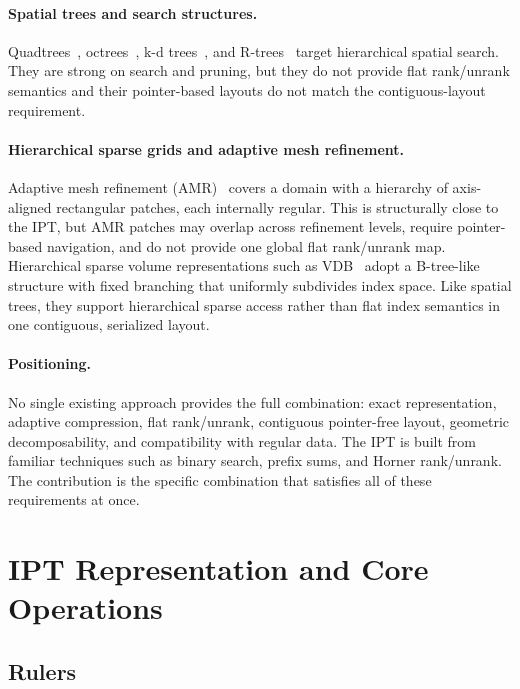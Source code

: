 \documentclass[manuscript,screen,review]{acmart}
\theoremstyle{definition}
\theoremstyle{plain}
\begin{document}
\paragraph{Spatial trees and search structures.}
Quadtrees~\cite{FinkelBentley1974}, octrees~\cite{Meagher1982},
k-d trees~\cite{Bentley1975}, and R-trees~\cite{Guttman1984} target
hierarchical spatial search. They are strong on search and pruning, but
they do not provide flat rank/unrank semantics and their pointer-based
layouts do not match the contiguous-layout requirement.

\paragraph{Hierarchical sparse grids and adaptive mesh refinement.}
Adaptive mesh refinement (AMR)~\cite{BergerOliger1984,BergerColella1989}
covers a domain with a hierarchy of axis-aligned rectangular patches,
each internally regular. This is structurally close to the IPT, but AMR
patches may overlap across refinement levels, require pointer-based
navigation, and do not provide one global flat rank/unrank map.
Hierarchical sparse volume representations such as VDB~\cite{Museth2013}
adopt a B-tree-like structure with fixed branching that uniformly
subdivides index space. Like spatial trees, they support hierarchical
sparse access rather than flat index semantics in one contiguous,
serialized layout.

\paragraph{Positioning.}
No single existing approach provides the full combination: exact
representation, adaptive compression, flat rank/unrank, contiguous
pointer-free layout, geometric decomposability, and compatibility with
regular data. The IPT is built from familiar techniques such as binary
search, prefix sums, and Horner rank/unrank. The contribution is the
specific combination that satisfies all of these requirements at once.

\section{IPT Representation and Core Operations}
\label{section:representation}

\subsection{Rulers}
\end{document}

